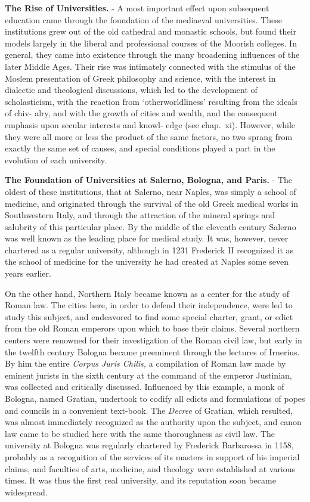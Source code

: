\documentclass[
]{book}
\begin{document}
\textbf{The Rise of Universities.} - A most important effect upon subsequent education came through the foundation of the mediaeval universities. These institutions grew out of the old cathedral and monastic schools, but found their models largely in the liberal and professional courses of the Moorish colleges. In general, they came into existence through the many broadening influences of the later Middle Ages. Their rise was intimately connected with the stimulus of the Moslem presentation of Greek philosophy and science, with the interest in dialectic and theological discussions, which led to the development of scholasticism, with the reaction from `otherworldliness' resulting from the ideals of chiv- alry, and with the growth of cities and wealth, and the consequent emphasis upon secular interests and knowl- edge (see chap.~xi). However, while they were all more or less the product of the same factors, no two sprang from exactly the same set of causes, and special conditions played a part in the evolution of each university.

\textbf{The Foundation of Universities at Salerno, Bologna, and Paris.} - The oldest of these institutions, that at Salerno, near Naples, was simply a school of medicine, and originated through the survival of the old Greek medical works in Southwestern Italy, and through the attraction of the mineral springs and salubrity of this particular place. By the middle of the eleventh century Salerno was well known as the leading place for medical study. It was, however, never chartered as a regular university, although in 1231 Frederick II recognized it as the school of medicine for the university he had created at Naples some seven years earlier.

On the other hand, Northern Italy became known as a center for the study of Roman law. The cities here, in order to defend their independence, were led to study this subject, and endeavored to find some special charter, grant, or edict from the old Roman emperors upon which to base their claims. Several northern centers were renowned for their investigation of the Roman civil law, but early in the twelfth century Bologna became preeminent through the lectures of Irnerius. By him the entire \emph{Corpus Juris Chilis,} a compilation of Roman law made by eminent jurists in the sixth century at the command of the emperor Justinian, was collected and critically discussed. Influenced by this example, a monk of Bologna, named Gratian, undertook to codify all edicts and formulations of popes and councils in a convenient text-book. The \emph{Decree} of Gratian, which resulted, was almost immediately recognized as the authority upon the subject, and canon law came to be studied here with the same thoroughness as civil law. The university at Bologna was regularly chartered by Frederick Barbarossa in 1158, probably as a recognition of the services of its masters in support of his imperial claims, and faculties of arts, medicine, and theology were established at various times. It was thus the first real university, and its reputation soon became widespread.
\end{document}
